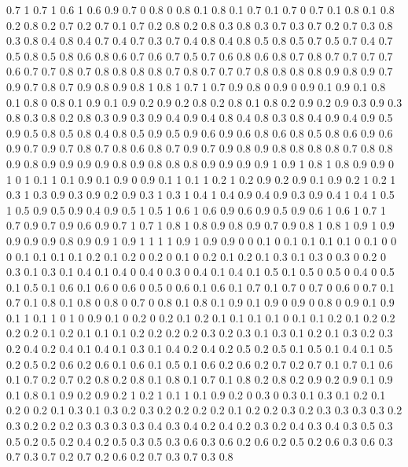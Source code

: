 0.7 1
0.7 1
0.6 1
0.6 0.9
0.7 0
0.8 0
0.8 0.1
0.8 0.1
0.7 0.1
0.7 0
0.7 0.1
0.8 0.1
0.8 0.2
0.8 0.2
0.7 0.2
0.7 0.1
0.7 0.2
0.8 0.2
0.8 0.3
0.8 0.3
0.7 0.3
0.7 0.2
0.7 0.3
0.8 0.3
0.8 0.4
0.8 0.4
0.7 0.4
0.7 0.3
0.7 0.4
0.8 0.4
0.8 0.5
0.8 0.5
0.7 0.5
0.7 0.4
0.7 0.5
0.8 0.5
0.8 0.6
0.8 0.6
0.7 0.6
0.7 0.5
0.7 0.6
0.8 0.6
0.8 0.7
0.8 0.7
0.7 0.7
0.7 0.6
0.7 0.7
0.8 0.7
0.8 0.8
0.8 0.8
0.7 0.8
0.7 0.7
0.7 0.8
0.8 0.8
0.8 0.9
0.8 0.9
0.7 0.9
0.7 0.8
0.7 0.9
0.8 0.9
0.8 1
0.8 1
0.7 1
0.7 0.9
0.8 0
0.9 0
0.9 0.1
0.9 0.1
0.8 0.1
0.8 0
0.8 0.1
0.9 0.1
0.9 0.2
0.9 0.2
0.8 0.2
0.8 0.1
0.8 0.2
0.9 0.2
0.9 0.3
0.9 0.3
0.8 0.3
0.8 0.2
0.8 0.3
0.9 0.3
0.9 0.4
0.9 0.4
0.8 0.4
0.8 0.3
0.8 0.4
0.9 0.4
0.9 0.5
0.9 0.5
0.8 0.5
0.8 0.4
0.8 0.5
0.9 0.5
0.9 0.6
0.9 0.6
0.8 0.6
0.8 0.5
0.8 0.6
0.9 0.6
0.9 0.7
0.9 0.7
0.8 0.7
0.8 0.6
0.8 0.7
0.9 0.7
0.9 0.8
0.9 0.8
0.8 0.8
0.8 0.7
0.8 0.8
0.9 0.8
0.9 0.9
0.9 0.9
0.8 0.9
0.8 0.8
0.8 0.9
0.9 0.9
0.9 1
0.9 1
0.8 1
0.8 0.9
0.9 0
1 0
1 0.1
1 0.1
0.9 0.1
0.9 0
0.9 0.1
1 0.1
1 0.2
1 0.2
0.9 0.2
0.9 0.1
0.9 0.2
1 0.2
1 0.3
1 0.3
0.9 0.3
0.9 0.2
0.9 0.3
1 0.3
1 0.4
1 0.4
0.9 0.4
0.9 0.3
0.9 0.4
1 0.4
1 0.5
1 0.5
0.9 0.5
0.9 0.4
0.9 0.5
1 0.5
1 0.6
1 0.6
0.9 0.6
0.9 0.5
0.9 0.6
1 0.6
1 0.7
1 0.7
0.9 0.7
0.9 0.6
0.9 0.7
1 0.7
1 0.8
1 0.8
0.9 0.8
0.9 0.7
0.9 0.8
1 0.8
1 0.9
1 0.9
0.9 0.9
0.9 0.8
0.9 0.9
1 0.9
1 1
1 1
0.9 1
0.9 0.9
0 0
0.1 0
0.1 0.1
0.1 0.1
0 0.1
0 0
0 0.1
0.1 0.1
0.1 0.2
0.1 0.2
0 0.2
0 0.1
0 0.2
0.1 0.2
0.1 0.3
0.1 0.3
0 0.3
0 0.2
0 0.3
0.1 0.3
0.1 0.4
0.1 0.4
0 0.4
0 0.3
0 0.4
0.1 0.4
0.1 0.5
0.1 0.5
0 0.5
0 0.4
0 0.5
0.1 0.5
0.1 0.6
0.1 0.6
0 0.6
0 0.5
0 0.6
0.1 0.6
0.1 0.7
0.1 0.7
0 0.7
0 0.6
0 0.7
0.1 0.7
0.1 0.8
0.1 0.8
0 0.8
0 0.7
0 0.8
0.1 0.8
0.1 0.9
0.1 0.9
0 0.9
0 0.8
0 0.9
0.1 0.9
0.1 1
0.1 1
0 1
0 0.9
0.1 0
0.2 0
0.2 0.1
0.2 0.1
0.1 0.1
0.1 0
0.1 0.1
0.2 0.1
0.2 0.2
0.2 0.2
0.1 0.2
0.1 0.1
0.1 0.2
0.2 0.2
0.2 0.3
0.2 0.3
0.1 0.3
0.1 0.2
0.1 0.3
0.2 0.3
0.2 0.4
0.2 0.4
0.1 0.4
0.1 0.3
0.1 0.4
0.2 0.4
0.2 0.5
0.2 0.5
0.1 0.5
0.1 0.4
0.1 0.5
0.2 0.5
0.2 0.6
0.2 0.6
0.1 0.6
0.1 0.5
0.1 0.6
0.2 0.6
0.2 0.7
0.2 0.7
0.1 0.7
0.1 0.6
0.1 0.7
0.2 0.7
0.2 0.8
0.2 0.8
0.1 0.8
0.1 0.7
0.1 0.8
0.2 0.8
0.2 0.9
0.2 0.9
0.1 0.9
0.1 0.8
0.1 0.9
0.2 0.9
0.2 1
0.2 1
0.1 1
0.1 0.9
0.2 0
0.3 0
0.3 0.1
0.3 0.1
0.2 0.1
0.2 0
0.2 0.1
0.3 0.1
0.3 0.2
0.3 0.2
0.2 0.2
0.2 0.1
0.2 0.2
0.3 0.2
0.3 0.3
0.3 0.3
0.2 0.3
0.2 0.2
0.2 0.3
0.3 0.3
0.3 0.4
0.3 0.4
0.2 0.4
0.2 0.3
0.2 0.4
0.3 0.4
0.3 0.5
0.3 0.5
0.2 0.5
0.2 0.4
0.2 0.5
0.3 0.5
0.3 0.6
0.3 0.6
0.2 0.6
0.2 0.5
0.2 0.6
0.3 0.6
0.3 0.7
0.3 0.7
0.2 0.7
0.2 0.6
0.2 0.7
0.3 0.7
0.3 0.8
